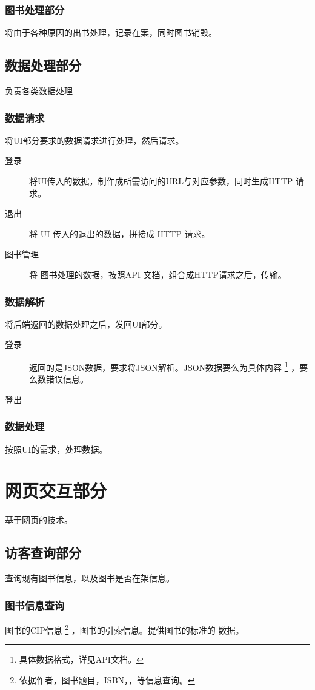 \documentclass[UTF8]{report}
\begin{document}
    \subsection{图书处理部分}
    将由于各种原因的出书处理，记录在案，同时图书销毁。
    \section{数据处理部分}
    负责各类数据处理
    \subsection{数据请求}
    将UI部分要求的数据请求进行处理，然后请求。
	\begin{description}
	\item[登录] 将UI传入的数据，制作成所需访问的URL与对应参数，同时生成HTTP
		请求。
    \item[退出] 将 UI 传入的退出的数据，拼接成 HTTP 请求。
    \item[图书管理] 将 图书处理的数据，按照API 文档，组合成HTTP请求之后，传输。
	\end{description}
    \subsection{数据解析}
    将后端返回的数据处理之后，发回UI部分。
	\begin{description}
	\item[登录] 返回的是JSON数据，要求将JSON解析。JSON数据要么为具体内容
		\footnote{具体数据格式，详见API文档。}
		，要么数错误信息。
	\item[登出]
	\end{description}
    \subsection{数据处理}
    按照UI的需求，处理数据。
    \chapter{网页交互部分}
    基于网页的技术。
    \section{访客查询部分}
    查询现有图书信息，以及图书是否在架信息。
    \subsection{图书信息查询}
    图书的CIP信息
    \footnote{依据作者，图书题目，ISBN，，等信息查询。}
    ，图书的引索信息。提供图书的标准的 \BibTeX 数据。
\end{document}
